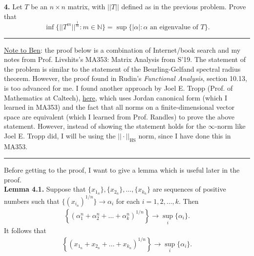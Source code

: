 \documentclass[11pt]{article}
\begin{document}
\newpage


\noindent \textbf{4.} Let $T$ be an $n \times n$ matrix,  with $||T||$ defined as in the previous problem.   Prove that
$$ \inf \{  || T^m || ^\frac{1}{m} : m \in \mathbb{N} \} = \sup \{ |\alpha| : \alpha \mbox{ an eigenvalue of } T \}. $$

\hrule
$\,$\\
\noindent \underline{Note to Ben}: the proof below is a combination of Internet/book search and my notes from Prof. Livshits's MA353: Matrix Analysis from S'19. The statement of the problem is similar to the statement of the Beurling-Gelfand spectral radius theorem. However, the proof found in Rudin's \textit{Functional Analysis}, section 10.13, is too advanced for me. I found another approach by Joel E. Tropp (Prof. of Mathematics at Caltech),  \href{https://pdfs.semanticscholar.org/0bb8/67b2a2cc8e2711bc3273e21db5acdbc06e4d.pdf}{\underline{here}}, which uses Jordan canonical form (which I learned in MA353) and the fact that all norms on a finite-dimensional vector space are equivalent (which I learned from Prof. Randles) to prove the above statement. However, instead of showing the statement holds for the $\infty$-norm like Joel E. Tropp did, I will be using the $||\cdot||_{\text{HS}}$ norm, since I have done this in MA353.  \\  

\hrule
$\,$\\




\noindent Before getting to the proof, I want to give a lemma which is useful later in the proof.\\


\noindent \textbf{Lemma 4.1.} Suppose that $\{x_{1_n} \}, \{x_{2_n}\}, \dots, \{x_{k_n}\}$ are sequences of positive numbers such that $ \{(x_{i_n})^{1/n}\} \to \alpha_i$ for each $i=1,2,\dots,k$. Then 
\begin{align*}
\left\{ (\alpha_1^n+ \alpha_2^n+ \dots + \alpha_k^n)^{1/n} \right\} \to \sup_{i}\{\alpha_i\}.
\end{align*} 
It follows that
\begin{align*}
\left\{ (x_{1_n}+ x_{2_n}+ \dots + x_{k_n})^{1/n} \right\} \to \sup_{i}\{\alpha_i \}.
\end{align*}
 
\end{document}
